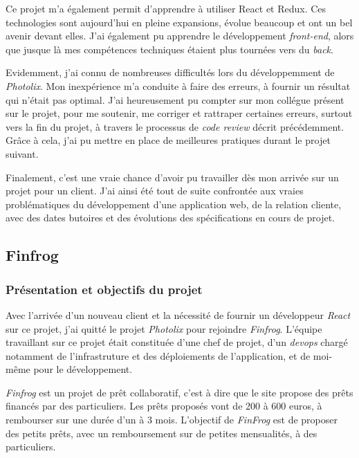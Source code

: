 \documentclass[12pt,a4paper]{article}
\begin{document}
  \bigskip

  Ce projet m'a également permit d'apprendre à utiliser React et Redux.
  Ces technologies sont aujourd'hui en pleine expansions, évolue beaucoup
  et ont un bel avenir devant elles. J'ai également pu apprendre le
  développement \emph{front-end}, alors que jusque là mes compétences
  techniques étaient plus tournées vers du \emph{back}.

  \bigskip

  Evidemment, j'ai connu de nombreuses difficultés lors du développemment
  de \emph{Photolix}. Mon inexpérience m'a conduite à faire des erreurs, à
  fournir un résultat qui n'était pas optimal. J'ai heureusement pu
  compter sur mon collégue présent sur le projet, pour me soutenir, me
  corriger et rattraper certaines erreurs, surtout vers la fin du projet,
  à travers le processus de \emph{code review} décrit précédemment. Grâce
  à cela, j'ai pu mettre en place de meilleures pratiques durant le projet
  suivant.

  \bigskip

  Finalement, c'est une vraie chance d'avoir pu travailler dès mon arrivée
  sur un projet pour un client. J'ai ainsi été tout de suite confrontée
  aux vraies problématiques du développement d'une application web, de la
  relation cliente, avec des dates butoires et des évolutions des
  spécifications en cours de projet.

  \subsection{Finfrog}\label{finfrog}

  \subsubsection{Présentation et objectifs du
  projet}\label{pruxe9sentation-et-objectifs-du-projet-1}

  \bigskip

  Avec l'arrivée d'un nouveau client et la nécessité de fournir un
  développeur \emph{React} sur ce projet, j'ai quitté le projet
  \emph{Photolix} pour rejoindre \emph{Finfrog}. L'équipe travaillant sur
  ce projet était constituée d'une chef de projet, d'un \emph{devops}
  chargé notamment de l'infrastruture et des déploiements de
  l'application, et de moi-même pour le développement.

  \bigskip

  \emph{Finfrog} est un projet de prêt collaboratif, c'est à dire que le
  site propose des prêts financés par des particuliers. Les prêts proposés
  vont de 200 à 600 euros, à rembourser sur une durée d'un à 3 mois.
  L'objectif de \emph{FinFrog} est de proposer des petits prêts, avec un
  remboursement sur de petites mensualités, à des particuliers.
\end{document}

